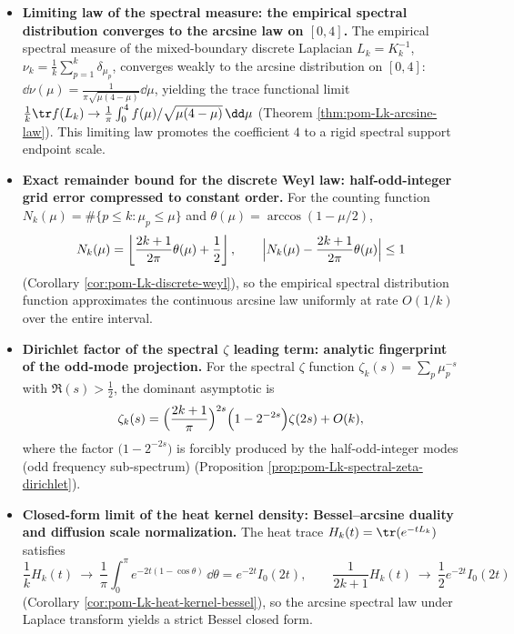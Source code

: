 \begin{enumerate}
\begin{itemize}
    \item \textbf{Limiting law of the spectral measure: the empirical spectral distribution converges to the arcsine law on \texorpdfstring{\([0,4]\)}{[0,4]}.}
    The empirical spectral measure of the mixed-boundary discrete Laplacian \(L_k=K_k^{-1}\),
    \(
    \nu_k=\frac1k\sum_{p=1}^k\delta_{\mu_p}
    \),
    converges weakly to the arcsine distribution on \([0,4]\): \(\dd\nu(\mu)=\frac{1}{\pi\sqrt{\mu(4-\mu)}}\dd\mu\), yielding the trace functional limit
    \(
    \frac1k\tr f(L_k)\to \frac1\pi\int_0^4 f(\mu)/\sqrt{\mu(4-\mu)}\,\dd\mu
    \)
    (Theorem \ref{thm:pom-Lk-arcsine-law}).
    This limiting law promotes the coefficient \(4\) to a rigid spectral support endpoint scale.

    \item \textbf{Exact remainder bound for the discrete Weyl law: half-odd-integer grid error compressed to constant order.}
    For the counting function \(N_k(\mu)=\#\{p\le k:\mu_p\le\mu\}\) and
    \(
    \theta(\mu)=\arccos(1-\mu/2)
    \),
    \[
    N_k(\mu)=\left\lfloor \frac{2k+1}{2\pi}\theta(\mu)+\frac12\right\rfloor,\qquad
    \Bigl|N_k(\mu)-\frac{2k+1}{2\pi}\theta(\mu)\Bigr|\le 1
    \]
    (Corollary \ref{cor:pom-Lk-discrete-weyl}), so the empirical spectral distribution function approximates the continuous arcsine law uniformly at rate \(O(1/k)\) over the entire interval.

    \item \textbf{Dirichlet factor of the spectral \texorpdfstring{\(\zeta\)}{zeta} leading term: analytic fingerprint of the odd-mode projection.}
    For the spectral \(\zeta\) function \(\zeta_k(s)=\sum_p\mu_p^{-s}\) with \(\Re(s)>\tfrac12\), the dominant asymptotic is
    \[
    \zeta_k(s)=\Bigl(\frac{2k+1}{\pi}\Bigr)^{2s}\Bigl(1-2^{-2s}\Bigr)\zeta(2s)+O(k),
    \]
    where the factor \(\bigl(1-2^{-2s}\bigr)\) is forcibly produced by the half-odd-integer modes (odd frequency sub-spectrum) (Proposition \ref{prop:pom-Lk-spectral-zeta-dirichlet}).

    \item \textbf{Closed-form limit of the heat kernel density: Bessel--arcsine duality and diffusion scale normalization.}
    The heat trace \(H_k(t)=\tr(e^{-tL_k})\) satisfies
    \[
    \frac1k H_k(t)\ \longrightarrow\ \frac{1}{\pi}\int_0^\pi e^{-2t(1-\cos\theta)}\,\dd\theta
    =e^{-2t}I_0(2t),
    \qquad
    \frac{1}{2k+1}H_k(t)\ \longrightarrow\ \frac12 e^{-2t}I_0(2t)
    \]
    (Corollary \ref{cor:pom-Lk-heat-kernel-bessel}), so the arcsine spectral law under Laplace transform yields a strict Bessel closed form.


\end{itemize}
\end{enumerate}
